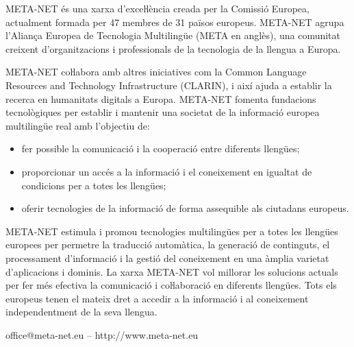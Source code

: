 \documentclass[]{../../metanetpaper}
\begin{document}
\begin{multicols}{2}

META-NET és una xarxa d’exceŀlència creada per la Comissió Europea, actualment formada per 47 membres de 31 països europeus. META-NET agrupa l’Aliança Europea de Tecnologia Multilingüe (META en anglès), una comunitat creixent d’organitzacions i professionals de la tecnologia de la llengua a Europa. 

META-NET coŀlabora amb altres iniciatives com la Common Language Resources and Technology Infrastructure (CLARIN), i així ajuda a establir la recerca en humanitats digitals a Europa. META-NET fomenta fundacions tecnològiques per establir i mantenir una societat de la informació europea multilingüe real amb l’objectiu de:
\begin{itemize}
\item fer possible la comunicació i la cooperació entre diferents llengües;
\item proporcionar un accés a la informació i el coneixement en igualtat de condicions per a totes les llengües;
\item oferir tecnologies de la informació de forma assequible als ciutadans europeus.
\end{itemize}

META-NET estimula i promou tecnologies multilingües per a totes les llengües europees per permetre la traducció automàtica, la generació de continguts, el processament d’informació i la gestió del coneixement en una àmplia varietat d’aplicacions i dominis. La xarxa META-NET vol millorar les solucions actuals per fer més efectiva la comunicació i coŀlaboració en diferents llengües. Tots els europeus tenen el mateix dret a accedir a la informació i al coneixement independentment de la seva llengua. 

\end{multicols}

\vfill
\centerline{office@meta-net.eu -- http://www.meta-net.eu}


\setcounter{section}{0}
\setcounter{figure}{0}

\cleardoublepage

\end{document}
